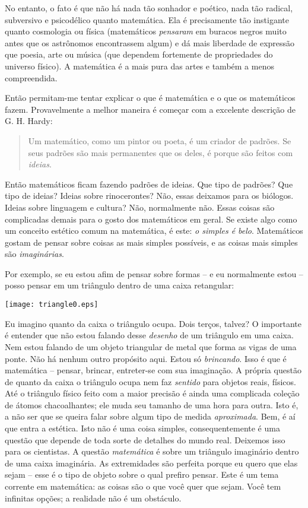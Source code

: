 \documentclass[a4paper,oneside,10pt,notitlepage]{article}
\begin{document}
No entanto, o fato é que não há nada tão sonhador e poético, nada tão radical, subversivo e psicodélico quanto matemática.
Ela é precisamente tão instigante quanto cosmologia ou física (matemáticos \textsl{pensaram} em buracos negros muito antes que os astrônomos encontrassem algum) e dá mais liberdade de expressão que poesia, arte ou música (que dependem fortemente de propriedades do universo físico).
A matemática é a mais pura das artes e também a menos compreendida.

Então permitam-me tentar explicar o que é matemática e o que os matemáticos fazem.
Provavelmente a melhor maneira é começar com a excelente descrição de G. H. Hardy:

\begin{quote}
Um matemático, como um pintor ou poeta, é um criador de padrões.
Se seus padrões são mais permanentes que os deles, é porque são feitos com \textsl{ideias}.
\end{quote}

Então matemáticos ficam fazendo padrões de ideias.
Que tipo de padrões? Que tipo de ideias?
Ideias sobre rinocerontes? Não, essas deixamos para os biólogos.
Ideias sobre linguagem e cultura? Não, normalmente não.
Essas coisas são complicadas demais para o gosto dos matemáticos em geral.
Se existe algo como um conceito estético comum na matemática, é este: \textsl{o simples é belo}.
Matemáticos gostam de pensar sobre coisas as mais simples possíveis, e as coisas mais simples são \textsl{imaginárias}.

Por exemplo, se eu estou afim de pensar sobre formas -- e eu normalmente estou -- posso pensar em um triângulo dentro de uma caixa retangular:

\begin{center}
\texttt{[image: triangle0.eps]}
\end{center}

Eu imagino quanto da caixa o triângulo ocupa.
Dois terços, talvez?
O importante é entender que não estou falando desse \textsl{desenho} de um triângulo em uma caixa.
Nem estou falando de um objeto triangular de metal que forma as vigas de uma ponte. %
Não há nenhum outro propósito aqui.
Estou só \textsl{brincando}.
Isso é que é matemática -- pensar, brincar, entreter-se com sua imaginação.
A própria questão de quanto da caixa o triângulo ocupa nem faz \textsl{sentido} para objetos reais, físicos.
Até o triângulo físico feito com a maior precisão é ainda uma complicada coleção de átomos chacoalhantes; ele muda seu tamanho de uma hora para outra.
Isto é, a não ser que se queira falar sobre algum tipo de medida \textsl{aproximada}.
Bem, é aí que entra a estética.
Isto não é uma coisa simples, consequentemente é uma questão que depende de toda sorte de detalhes do mundo real.
Deixemos isso para os cientistas.
A questão \textsl{matemática} é sobre um triângulo imaginário dentro de uma caixa imaginária.
As extremidades são perfeita porque eu quero que elas sejam -- esse é o tipo de objeto sobre o qual prefiro pensar.
Este é um tema corrente em matemática: as coisas são o que você quer que sejam.
Você tem infinitas opções; a realidade não é um obstáculo.
\end{document}
